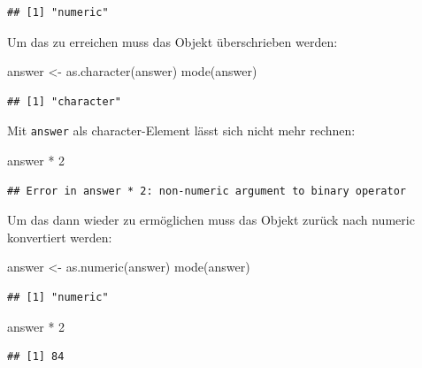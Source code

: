 \documentclass[
]{book}
\newenvironment{Shaded}{\begin{snugshade}}{\end{snugshade}}
\newcommand{\DecValTok}[1]{\textcolor[rgb]{0.00,0.00,0.81}{#1}}
\newcommand{\FunctionTok}[1]{\textcolor[rgb]{0.00,0.00,0.00}{#1}}
\newcommand{\NormalTok}[1]{#1}
\newcommand{\OtherTok}[1]{\textcolor[rgb]{0.56,0.35,0.01}{#1}}
\newcommand{\SpecialCharTok}[1]{\textcolor[rgb]{0.00,0.00,0.00}{#1}}
\begin{document}
\begin{verbatim}
## [1] "numeric"
\end{verbatim}

Um das zu erreichen muss das Objekt überschrieben werden:

\begin{Shaded}
\begin{Highlighting}[]
\NormalTok{answer }\OtherTok{\textless{}{-}} \FunctionTok{as.character}\NormalTok{(answer)}
\FunctionTok{mode}\NormalTok{(answer)}
\end{Highlighting}
\end{Shaded}

\begin{verbatim}
## [1] "character"
\end{verbatim}

Mit \texttt{answer} als character-Element lässt sich nicht mehr rechnen:

\begin{Shaded}
\begin{Highlighting}[]
\NormalTok{answer }\SpecialCharTok{*} \DecValTok{2}
\end{Highlighting}
\end{Shaded}

\begin{verbatim}
## Error in answer * 2: non-numeric argument to binary operator
\end{verbatim}

Um das dann wieder zu ermöglichen muss das Objekt zurück nach numeric konvertiert werden:

\begin{Shaded}
\begin{Highlighting}[]
\NormalTok{answer }\OtherTok{\textless{}{-}} \FunctionTok{as.numeric}\NormalTok{(answer)}
\FunctionTok{mode}\NormalTok{(answer)}
\end{Highlighting}
\end{Shaded}

\begin{verbatim}
## [1] "numeric"
\end{verbatim}

\begin{Shaded}
\begin{Highlighting}[]
\NormalTok{answer }\SpecialCharTok{*} \DecValTok{2}
\end{Highlighting}
\end{Shaded}

\begin{verbatim}
## [1] 84
\end{verbatim}
\end{document}
